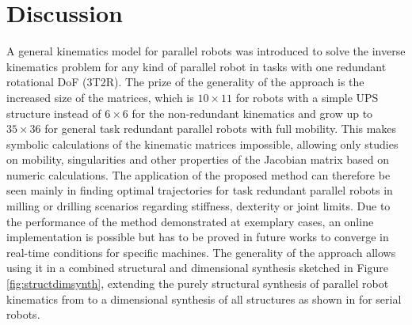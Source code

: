 \documentclass[robotics,article,accept,moreauthors,pdftex]{Definitions/mdpi}
\begin{document}
\section{Discussion}


A general kinematics model for parallel robots was introduced to solve the inverse kinematics problem for any kind of parallel robot in tasks with one redundant rotational DoF (3T2R).
The prize of the generality of the approach is the increased size of the  matrices, which is $10 \times 11$ for robots with a simple UPS structure
instead of $6\times6$ for the non-redundant kinematics and grow up to $35 \times 36$ for general task redundant parallel robots with full mobility.
This makes symbolic calculations of the kinematic matrices impossible, allowing only studies on mobility, singularities and other properties of the Jacobian matrix based on numeric calculations.
The application of the proposed method can therefore be seen mainly in finding optimal trajectories for task redundant parallel robots in milling or drilling scenarios regarding stiffness, dexterity or joint limits.
%
Due to the performance of the method demonstrated at exemplary cases, an online implementation is possible but has to be proved in future works to converge in real-time conditions for specific machines.
The generality of the approach allows using it in a combined structural and dimensional synthesis sketched in Figure\,\ref{fig:structdimsynth}, extending the purely structural synthesis of parallel robot kinematics from \cite{Gogu2008,KongGos2005} to a dimensional synthesis of all structures as shown in \cite{RamirezKotOrt2015} for serial robots.
\end{document}
